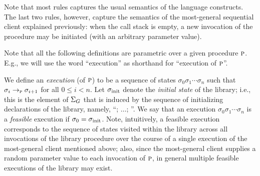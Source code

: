 Note that most rules captures the usual semantics of the language constructs.
The last two rules, however, capture the semantics of the most-general sequential
client explained previously: when the call stack is empty, a new invocation of
the procedure may be initiated (with an arbitrary parameter value).


Note that all the following definitions are parametric over a given procedure $\textsc{p}$.
E.g., we will use the word ``execution'' as shorthand for ``execution of $\textsc{p}$''.

We define an \emph{execution} (of $\textsc{p}$) to be a sequence of states $\sigma_0 \sigma_1 \cdots \sigma_n$ such that
$\sigma_i \rightarrow_{\textsc{p}} \sigma_{i+1}$ for all $0 \leq i < n$.
Let $\sigma_{\text{init}}$ denote the \emph{initial state} of the library; i.e., this
is the element of $\Sigma_G$ that is induced by the sequence of initializing declarations of
the library, namely, ``;
$\ldots$; ''.
We say that an execution $\sigma_0 \sigma_1 \cdots \sigma_n$ is a
\emph{feasible} execution if $\sigma_0 = \sigma_{\text{init}}$. Note, 
intuitively, a feasible execution  corresponds to the sequence
of states visited within the library across all invocations of
the library procedure over the course of a single execution of
the most-general client mentioned above; also, since the most-general client
supplies a random parameter value to each invocation of $\textsc{p}$, in general
multiple feasible executions of the library may exist.


